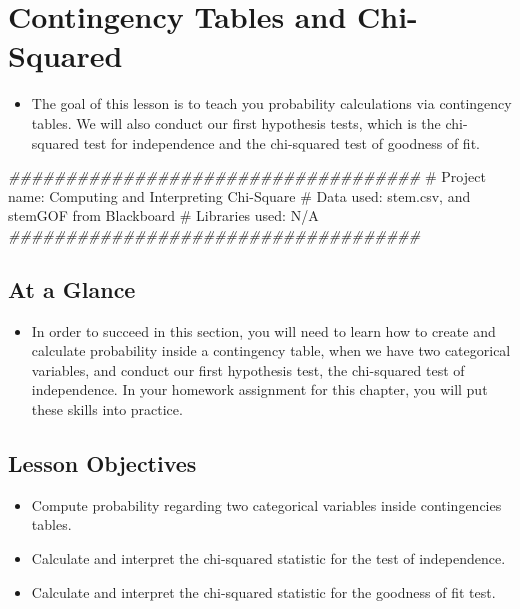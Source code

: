 \documentclass[
  letterpaper,
  DIV=11,
  numbers=noendperiod]{scrreprt}
\newenvironment{Shaded}{\begin{snugshade}}{\end{snugshade}}
\newcommand{\CommentTok}[1]{\textcolor[rgb]{0.37,0.37,0.37}{#1}}
\newcommand{\DocumentationTok}[1]{\textcolor[rgb]{0.37,0.37,0.37}{\textit{#1}}}
\providecommand{\tightlist}{%
  \setlength{\itemsep}{0pt}\setlength{\parskip}{0pt}}\usepackage{longtable,booktabs,array}
\begin{document}

\chapter{Contingency Tables and
Chi-Squared}\label{contingency-tables-and-chi-squared}

\begin{itemize}
\tightlist
\item
  The goal of this lesson is to teach you probability calculations via
  contingency tables. We will also conduct our first hypothesis tests,
  which is the chi-squared test for independence and the chi-squared
  test of goodness of fit.
\end{itemize}

\begin{Shaded}
\begin{Highlighting}[]
\DocumentationTok{\#\#\#\#\#\#\#\#\#\#\#\#\#\#\#\#\#\#\#\#\#\#\#\#\#\#\#\#\#\#\#\#\#\#\#\#}
\CommentTok{\# Project name: Computing and Interpreting Chi{-}Square}
\CommentTok{\# Data used: stem.csv, and stemGOF from Blackboard}
\CommentTok{\# Libraries used: N/A}
\DocumentationTok{\#\#\#\#\#\#\#\#\#\#\#\#\#\#\#\#\#\#\#\#\#\#\#\#\#\#\#\#\#\#\#\#\#\#\#\#}
\end{Highlighting}
\end{Shaded}

\section{At a Glance}\label{at-a-glance-4}

\begin{itemize}
\tightlist
\item
  In order to succeed in this section, you will need to learn how to
  create and calculate probability inside a contingency table, when we
  have two categorical variables, and conduct our first hypothesis test,
  the chi-squared test of independence. In your homework assignment for
  this chapter, you will put these skills into practice.
\end{itemize}

\section{Lesson Objectives}\label{lesson-objectives-5}

\begin{itemize}
\tightlist
\item
  Compute probability regarding two categorical variables inside
  contingencies tables.
\item
  Calculate and interpret the chi-squared statistic for the test of
  independence.
\item
  Calculate and interpret the chi-squared statistic for the goodness of
  fit test.
\end{itemize}
\end{document}
